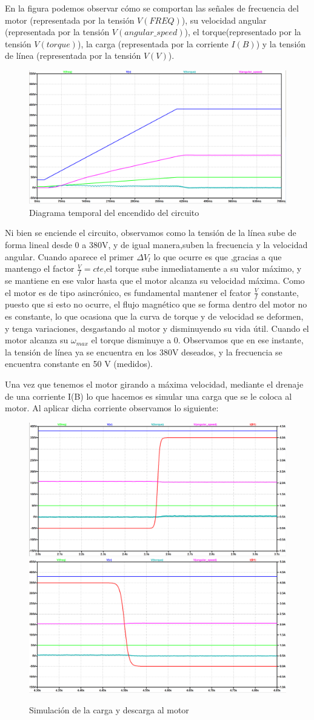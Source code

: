 \documentclass[e4_tp3_main.tex]{subfiles}
\begin{document}
En la figura podemos observar cómo se comportan las señales de frecuencia del motor (representada por la tensión $V(FREQ)$), su velocidad angular (representada por la tensión $V(angular\_speed)$), el torque(representado por la tensión $V(torque)$), la carga (representada por la corriente $I(B)$) y la tensión de línea (representada por la tensión $V(V)$).
\begin{figure}[H]
\centering
\includegraphics[width=0.7\linewidth]{Imagenes/3-1-a-inicio.png}
\caption{Diagrama temporal del encendido del circuito}
\end{figure}

Ni bien se enciende el circuito, observamos como la tensión de la línea sube de forma lineal desde 0 a 380V, y de igual manera,suben la frecuencia y la velocidad angular. Cuando aparece el primer $\Delta V_l$ lo que ocurre es que ,gracias a que mantengo el factor $\frac{V}{f}=cte$,el torque sube inmediatamente a su valor máximo, y se mantiene en ese valor hasta que el motor alcanza su velocidad máxima. Como el motor es de tipo asincrónico, es fundamental mantener el fcator $\frac{V}{f}$ constante, puesto que si esto no ocurre, el flujo magnético que se forma dentro del motor no es constante, lo que ocasiona que la curva de torque y de velocidad se deformen, y tenga variaciones, desgastando al motor y disminuyendo su vida útil.
 Cuando el motor alcanza su $\omega_{max}$ el torque disminuye a 0. Observamos que en ese instante, la tensión de línea ya se encuentra en los 380V deseados, y la frecuencia se encuentra constante en 50 V (medidos).

Una vez que tenemos el motor girando a máxima velocidad, mediante el drenaje de una corriente I(B) lo que hacemos es simular una carga que se le coloca al motor. Al aplicar dicha corriente observamos lo siguiente:
\begin{figure}[H]
\centering
\includegraphics[width=0.45\linewidth]{Imagenes/3-1-a-carga.png}
\includegraphics[width=0.45\linewidth]{Imagenes/3-1-a-descarga.png}
\caption{Simulación de la carga y descarga al motor}
\end{figure}
\end{document}
